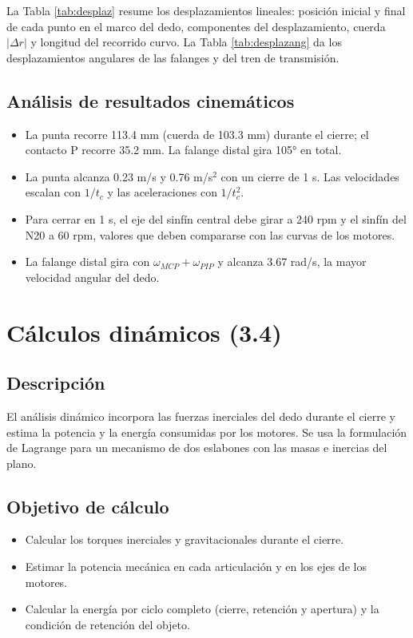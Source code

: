 \documentclass[11pt,letterpaper]{article}
\begin{document}
La Tabla \ref{tab:desplaz} resume los desplazamientos lineales: posición inicial y final de cada punto en el marco del dedo, componentes del desplazamiento, cuerda $|\Delta r|$ y longitud del recorrido curvo. La Tabla \ref{tab:desplazang} da los desplazamientos angulares de las falanges y del tren de transmisión.






\subsection{Análisis de resultados cinemáticos}
\begin{itemize}
\item La punta recorre 113.4 mm (cuerda de 103.3 mm) durante el cierre; el contacto P recorre 35.2 mm. La falange distal gira 105° en total.
\item La punta alcanza 0.23 m/s y 0.76 m/s$^2$ con un cierre de 1 s. Las velocidades escalan con $1/t_c$ y las aceleraciones con $1/t_c^2$.
\item Para cerrar en 1 s, el eje del sinfín central debe girar a 240 rpm y el sinfín del N20 a 60 rpm, valores que deben compararse con las curvas de los motores.
\item La falange distal gira con $\omega_{MCP}+\omega_{PIP}$ y alcanza 3.67 rad/s, la mayor velocidad angular del dedo.
\end{itemize}

\section{Cálculos dinámicos (3.4)}
\subsection{Descripción}
El análisis dinámico incorpora las fuerzas inerciales del dedo durante el cierre y estima la potencia y la energía consumidas por los motores. Se usa la formulación de Lagrange para un mecanismo de dos eslabones con las masas e inercias del plano.

\subsection{Objetivo de cálculo}
\begin{itemize}
\item Calcular los torques inerciales y gravitacionales durante el cierre.
\item Estimar la potencia mecánica en cada articulación y en los ejes de los motores.
\item Calcular la energía por ciclo completo (cierre, retención y apertura) y la condición de retención del objeto.
\end{itemize}
\end{document}

